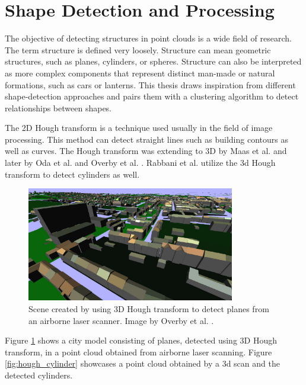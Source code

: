 \section {Shape Detection and Processing}
\label{sec:related_work_shape detection}

The objective of detecting structures in point clouds is a wide field of research. The term structure is defined very loosely. Structure can mean geometric structures, such as planes, cylinders, or spheres. Structure can also be interpreted as more complex components that represent distinct man-made or natural formations, such as cars or lanterns. This thesis draws inspiration from different shape-detection approaches and pairs them with a clustering algorithm to detect relationships between shapes. 

\par


The 2D Hough transform \cite{hough1962method} is a technique used usually in the field of image processing. This method can detect straight lines such as building contours as well as curves. The Hough transform was extending to 3D by Maas et al. \cite{maas1999two} and later by Oda et al. \cite{oda2004automatic} and Overby et al. \cite{overby2004automatic}. Rabbani et al. \cite{rabbani2005efficient} utilize the 3d Hough transform to detect cylinders as well. 


\begin{figure}
    \centering
    \includegraphics[width=0.81\textwidth]{Related_Work/hough_planes.png}%
    \caption[Scene created by using 3d Hough transform to detect planes from an airborne laser scanner]
		{Scene created by using 3D Hough transform to detect planes from an airborne laser scanner. Image by Overby et al. \cite{overby2004automatic}.}
    \label{fig:hough_planes}
\end{figure}

Figure \ref{fig:hough_planes} shows a city model consisting of planes, detected using 3D Hough transform, in a point cloud obtained from airborne laser scanning. Figure \ref{fig:hough_cylinder} showcases a point cloud obtained by a 3d scan and the detected cylinders. 


